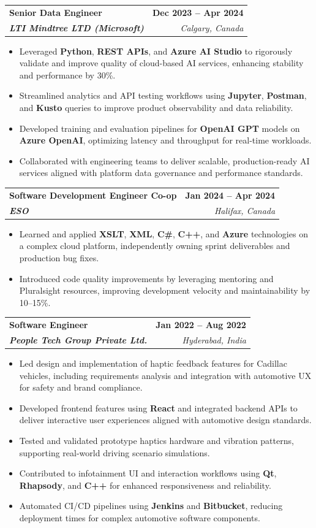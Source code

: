 \documentclass[letterpaper,11pt]{article}
\makeatletter
\newcommand{\resumeItem}[1]{
  \item\small{
    {#1 \vspace{-2pt}}
  }
}
\newcommand{\resumeSubheading}[4]{
  \vspace{-2pt}\item
    \begin{tabular*}{1.0\textwidth}[t]{l@{\extracolsep{\fill}}r}
      \textbf{#1} & \textbf{\small #2} \\
      \textit{\small#3} & \textit{\small #4} \\
    \end{tabular*}\vspace{-7pt}
}
\newcommand{\resumeItemListStart}{\begin{itemize}}
\newcommand{\resumeItemListEnd}{\end{itemize}\vspace{-5pt}}
\makeatother
\begin{document}
    \resumeSubheading
      {\textbf{Senior Data Engineer}}{\textbf{Dec 2023 -- Apr 2024}}
      {\textbf{LTI Mindtree LTD (Microsoft)}}{Calgary, Canada}
      \resumeItemListStart
        \resumeItem{Leveraged \textbf{Python}, \textbf{REST APIs}, and \textbf{Azure AI Studio} to rigorously validate and improve quality of cloud-based AI services, enhancing stability and performance by 30\%.}
        \resumeItem{Streamlined analytics and API testing workflows using \textbf{Jupyter}, \textbf{Postman}, and \textbf{Kusto} queries to improve product observability and data reliability.}
        \resumeItem{Developed training and evaluation pipelines for \textbf{OpenAI GPT} models on \textbf{Azure OpenAI}, optimizing latency and throughput for real-time workloads.}
        \resumeItem{Collaborated with engineering teams to deliver scalable, production-ready AI services aligned with platform data governance and performance standards.}
      \resumeItemListEnd
    
    \resumeSubheading
      {\textbf{Software Development Engineer Co-op}}{\textbf{Jan 2024 -- Apr 2024}}
      {\textbf{ESO}}{Halifax, Canada}
      \resumeItemListStart
        \resumeItem{Learned and applied \textbf{XSLT}, \textbf{XML}, \textbf{C\#}, \textbf{C++}, and \textbf{Azure} technologies on a complex cloud platform, independently owning sprint deliverables and production bug fixes.}
        \resumeItem{Introduced code quality improvements by leveraging mentoring and Pluralsight resources, improving development velocity and maintainability by 10–15\%.}
      \resumeItemListEnd

    \resumeSubheading
      {\textbf{Software Engineer}}{\textbf{Jan 2022 -- Aug 2022}}
      {\textbf{People Tech Group Private Ltd.}}{Hyderabad, India}
      \resumeItemListStart
        \resumeItem{Led design and implementation of haptic feedback features for Cadillac vehicles, including requirements analysis and integration with automotive UX for safety and brand compliance.}
        \resumeItem{Developed frontend features using \textbf{React} and integrated backend APIs to deliver interactive user experiences aligned with automotive design standards.}
        \resumeItem{Tested and validated prototype haptics hardware and vibration patterns, supporting real-world driving scenario simulations.}
        \resumeItem{Contributed to infotainment UI and interaction workflows using \textbf{Qt}, \textbf{Rhapsody}, and \textbf{C++} for enhanced responsiveness and reliability.}
        \resumeItem{Automated CI/CD pipelines using \textbf{Jenkins} and \textbf{Bitbucket}, reducing deployment times for complex automotive software components.}
      \resumeItemListEnd
\end{document}
